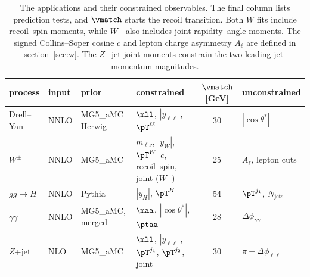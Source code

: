 
\begin{table}[!htbp]
\centering
\tabsetup
\begin{tabular}{@{}l l l l c l@{}}
\toprule
process & input & prior & constrained & $\vmatch$ [GeV] & unconstrained \\
\midrule
Drell--Yan & NNLO & \shortstack[l]{MG5\_aMC\\Herwig} & $\mll$, $|y_{\ell\ell}|$, $\pT^{\ell\ell}$ & 30 & $|\cos\theta^{*}|$ \\
$W^{\pm}$ & NNLO & MG5\_aMC & \shortstack[l]{$m_{\ell\nu}$, $|y_W|$, $\pT^{W}$\\$c$, recoil--spin, joint ($W^-$)} & 25 & $A_\ell$, lepton cuts \\
$gg\to H$ & NNLO & Pythia & $|y_H|$, $\pT^{H}$ & 54 & $\pT^{j_1}$, $N_\mathrm{jets}$ \\
$\gamma\gamma$ & NNLO & MG5\_aMC, merged & $\maa$, $|\cos\theta^{*}|$, $\ptaa$ & 28 & $\Delta\phi_{\gamma\gamma}$ \\
$Z$+jet & NLO & MG5\_aMC & $\mll$, $|y_{\ell\ell}|$, $\pT^{j_1}$, $\pT^{j_2}$, joint & 30 & $\pi-\Delta\phi_{\ell\ell}$ \\
\bottomrule
\end{tabular}
\caption{The applications and their constrained observables. The final column lists prediction tests, and $\vmatch$ starts the recoil transition. Both $W$ fits include recoil--spin moments, while $W^-$ also includes joint rapidity--angle moments. The signed Collins--Soper cosine $c$ and lepton charge asymmetry $A_\ell$ are defined in section~\ref{sec:w}. The $Z$+jet joint moments constrain the two leading jet-momentum magnitudes.}
\label{tab:processes}
\end{table}

